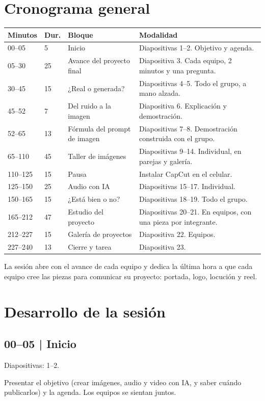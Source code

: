 \documentclass[11pt,a4paper]{article}
\newcommand{\diapos}[1]{\textcolor{gris}{\small\textsf{Diapositivas: #1}}\par}
\begin{document}
\section{Cronograma general}
\small
\begin{longtable}{@{}p{2.0cm}p{1.1cm}p{5.2cm}p{5.6cm}@{}}
\toprule \textbf{Minutos} & \textbf{Dur.} & \textbf{Bloque} & \textbf{Modalidad}\\\midrule\endhead
00--05 & 5 & Inicio & Diapositivas 1--2. Objetivo y agenda.\\
05--30 & 25 & Avance del proyecto final & Diapositiva 3. Cada equipo, 2 minutos y una pregunta.\\
30--45 & 15 & ¿Real o generada? & Diapositivas 4--5. Todo el grupo, a mano alzada.\\
45--52 & 7 & Del ruido a la imagen & Diapositiva 6. Explicación y demostración.\\
52--65 & 13 & Fórmula del prompt de imagen & Diapositivas 7--8. Demostración construida con el grupo.\\
65--110 & 45 & Taller de imágenes & Diapositivas 9--14. Individual, en parejas y galería.\\
110--125 & 15 & Pausa & Instalar CapCut en el celular.\\
125--150 & 25 & Audio con IA & Diapositivas 15--17. Individual.\\
150--165 & 15 & ¿Está bien o no? & Diapositivas 18--19. Todo el grupo.\\
165--212 & 47 & Estudio del proyecto & Diapositivas 20--21. En equipos, con una pieza por integrante.\\
212--227 & 15 & Galería de proyectos & Diapositiva 22. Equipos.\\
227--240 & 13 & Cierre y tarea & Diapositiva 23.\\\bottomrule
\end{longtable}
\normalsize
La sesión abre con el avance de cada equipo y dedica la última hora a que cada equipo cree las piezas para comunicar su proyecto: portada, logo, locución y reel.

\section{Desarrollo de la sesión}
\subsection{00--05 | Inicio}
\diapos{1--2.}
Presentar el objetivo (crear imágenes, audio y video con IA, y saber cuándo publicarlos) y la agenda. Los equipos se sientan juntos.
\end{document}
